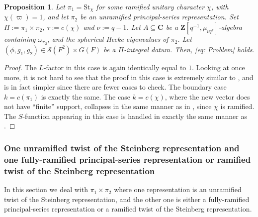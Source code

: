 \documentclass{amsart}
\theoremstyle{plain}
\newtheorem{prop}[thm]{Proposition}
\theoremstyle{plain}
\theoremstyle{remark}
\begin{document}
\begin{prop}\label{thm unr p-s x ram St}
    Let $\pi_1=\mathrm{St}_\chi$ for some ramified unitary character $\chi$, with $\chi(\varpi)=1$, and let $\pi_2$ be an unramified principal-series representation. Set $\Pi:=\pi_1\times \pi_2$, $\tau:=c(\chi)$ and $\nu:=q-1$. Let $A\subseteq\mathbf{C}$ be a $\mathbf{Z}[q^{-1},\mu_{\nu q^\tau}]$-algebra containing $\omega_{\pi_2}$, and the spherical Hecke eigenvalues of $\pi_2$. Let $(\phi,g_1,g_2)\in\mathcal{S}(F^2)\times G(F)$ be a $\Pi$-integral datum. Then, \eqref{eq: Problem} holds.
\end{prop}
\begin{proof}
    The $L$-factor in this case is again identically equal to $1$. Looking at \cite[Lemma $3.3$]{Assing_2018} once more, it is not hard to see that the proof in this case is extremely similar to , and is in fact simpler since there are fewer cases to check. The boundary case $k=c(\pi_1)$ is exactly the same. The case $k=c(\chi)$, where the new vector does not have ``finite'' support, collapses in the same manner as in , since $\chi$ is ramified. The $S$-function appearing in this case is handled in exactly the same manner as .
\end{proof}
\subsubsection{One unramified twist of the Steinberg representation and one fully-ramified principal-series representation or ramified twist of the Steinberg representation}

In this section we deal with $\pi_1\times \pi_2$ where one representation is an unramified twist of the Steinberg representation, and the other one is either a fully-ramified principal-series representation or a ramified twist of the Steinberg representation.
\end{document}
